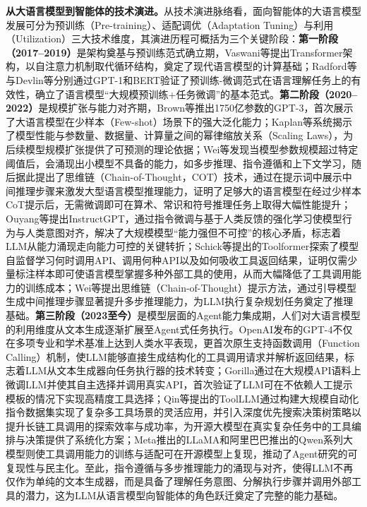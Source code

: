 \textbf{从大语言模型到智能体的技术演进。}从技术演进脉络看，面向智能体的大语言模型发展可分为预训练（Pre-training）、适配调优（Adaptation Tuning）与利用（Utilization）三大技术维度\cite{zhao2023survey}，其演进历程可概括为三个关键阶段：\textbf{第一阶段（2017--2019）}是架构奠基与预训练范式确立期，Vaswani等\cite{vaswani2017attention}提出Transformer架构，以自注意力机制取代循环结构，奠定了现代语言模型的计算基础；Radford等\cite{radford2018improving}与Devlin等\cite{devlin2019bert}分别通过GPT-1和BERT验证了预训练-微调范式在语言理解任务上的有效性，确立了语言模型“大规模预训练+任务微调”的基本范式。\textbf{第二阶段（2020--2022）}是规模扩张与能力对齐期，Brown等\cite{brown2020language}推出1750亿参数的GPT-3，首次展示了大语言模型在少样本（Few-shot）场景下的强大泛化能力；Kaplan等\cite{kaplan2020scaling}系统揭示了模型性能与参数量、数据量、计算量之间的幂律缩放关系（Scaling Laws），为后续模型规模扩张提供了可预测的理论依据；Wei等\cite{wei2022emergent}发现当模型参数规模超过特定阈值后，会涌现出小模型不具备的能力，如多步推理、指令遵循和上下文学习，随后据此提出了思维链（Chain-of-Thought，COT）\cite{wei2022chain}技术，通过在提示词中展示中间推理步骤来激发大型语言模型推理能力，证明了足够大的语言模型在经过少样本CoT提示后，无需微调即可在算术、常识和符号推理任务上取得大幅性能提升；Ouyang等\cite{ouyang2022training}提出InstructGPT，通过指令微调与基于人类反馈的强化学习使模型行为与人类意图对齐，解决了大规模模型“能力强但不可控”的核心矛盾，标志着LLM从能力涌现走向能力可控的关键转折；Schick等\cite{schick2023toolformer}提出的Toolformer探索了模型自监督学习何时调用API、调用何种API以及如何吸收工具返回结果，证明仅需少量标注样本即可使语言模型掌握多种外部工具的使用，从而大幅降低了工具调用能力的训练成本；Wei等\cite{wei2022chain}提出思维链（Chain-of-Thought）提示方法，通过引导模型生成中间推理步骤显著提升多步推理能力，为LLM执行复杂规划任务奠定了推理基础。\textbf{第三阶段（2023至今）}是模型层面的Agent能力集成期，人们对大语言模型的利用维度从文本生成逐渐扩展至Agent式任务执行。OpenAI发布的GPT-4\cite{openai2023gpt4}不仅在多项专业和学术基准上达到人类水平表现，更首次原生支持函数调用（Function Calling）机制，使LLM能够直接生成结构化的工具调用请求并解析返回结果，标志着LLM从文本生成器向任务执行器的技术转变；Gorilla\cite{patil2024gorilla}通过在大规模API语料上微调LLM并使其自主选择并调用真实API，首次验证了LLM可在不依赖人工提示模板的情况下实现高精度工具选择；Qin等\cite{qin2024toolllm}提出的ToolLLM通过构建大规模自动化指令数据集实现了复杂多工具场景的灵活应用，并引入深度优先搜索决策树策略以提升长链工具调用的探索效率与成功率，为开源大模型在真实复杂任务中的工具编排与决策提供了系统化方案；Meta推出的LLaMA\cite{touvron2023llama}和阿里巴巴推出的Qwen\cite{yang2025qwen3technicalreport}系列大模型则使工具调用能力的训练与适配可在开源模型上复现，推动了Agent研究的可复现性与民主化。至此，指令遵循与多步推理能力的涌现与对齐，使得LLM不再仅作为单纯的文本生成器，而是具备了理解任务意图、分解执行步骤并调用外部工具的潜力，这为LLM从语言模型向智能体的角色跃迁奠定了完整的能力基础。

